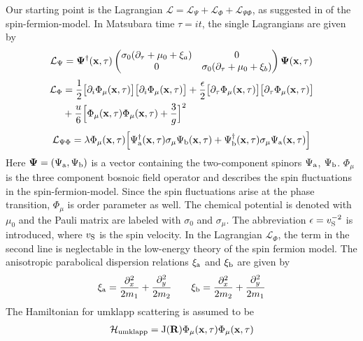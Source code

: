 Our starting point is the Lagrangian $\mathcal{L} = \mathcal{L}_{\Psi} + \mathcal{L}_{\Phi} + \mathcal{L}_{\Psi\Phi}$, as suggested in \cite{Patel&Sachdev} of the spin-fermion-model.
In Matsubara time $\tau = it$, the single Lagrangians are given by
%
\begin{align}
	\mathcal{L}_{\Psi} = 
		\vb{\Psi}^{\dag}(\vb{x},\tau)
		\begin{pmatrix}\sigma_{0} (\partial_{\tau}+\mu_{0}+\xi_{a}) & 0\\0 & \sigma_{0} (\partial_{\tau}+\mu_{0}+\xi_{b})\end{pmatrix}
		\vb{\Psi}(\vb{x},\tau)
\end{align}
%
\begin{align}
	\mathcal{L}_{\Phi} &= 
		\frac{1}{2} \big[\partial_{i}\Phi_{\mu}(\vb{x},\tau)\big] \big[\partial_{i}\Phi_{\mu}(\vb{x},\tau)\big] 
		+ 
		\frac{\epsilon}{2} \big[\partial_{\tau}\Phi_{\mu}(\vb{x},\tau)\big] \big[\partial_{\tau}\Phi_{\mu}(\vb{x},\tau)\big] 
		\notag \\&+
		\frac{u}{6} \Big[\Phi_{\mu}(\vb{x},\tau) \Phi_{\mu}(\vb{x},\tau) + \frac{3}{g}\Big]^{2}
\end{align}
%
\begin{align}
	\mathcal{L}_{\Psi\Phi} =
		\lambda\Phi_{\mu}(\vb{x},\tau) \Big[\Psi_{\mathrm{a}}^{\dag}(\vb{x},\tau) \sigma_{\mu} \Psi_{\mathrm{b}}(\vb{x},\tau) + \Psi_{\mathrm{b}}^{\dag}(\vb{x},\tau) \sigma_{\mu} \Psi_{\mathrm{a}}(\vb{x},\tau)\Big]
\end{align}
%
Here $\vb{\Psi} = (\Psi_{\mathrm{a}}, \Psi_{\mathrm{b}})$ is a vector containing the two-component spinors $\Psi_{\mathrm{a}}$, $\Psi_{\mathrm{b}}$.
$\Phi_{\mu}$ is the three component bosnoic field operator and describes the spin fluctuations in the spin-fermion-model.
Since the spin fluctuations arise at the phase transition, $\Phi_{\mu}$ is order parameter as well.
The chemical potential is denoted with $\mu_{0}$ and the Pauli matrix are labeled with $\sigma_{0}$ and $\sigma_{\mu}$.
The abbreviation $\epsilon = v_{\mathrm{S}}^{-2}$ is introduced, where $v_{\mathrm{S}}$ is the spin velocity.
In the Lagrangian $\mathcal{L}_{\Phi}$, the term in the second line is neglectable in the low-energy theory of the spin fermion model.
The anisotropic parabolical dispersion relations $\xi_{\mathrm{a}}$ and $\xi_{\mathrm{b}}$ are given by 
%
\begin{align}
	\xi_{\mathrm{a}} = \frac{\partial_{x}^{2}}{2m_{1}} + \frac{\partial_{y}^{2}}{2m_{2}} \qquad \xi_{\mathrm{b}} = \frac{\partial_{x}^{2}}{2m_{2}} + \frac{\partial_{y}^{2}}{2m_{1}}
\end{align}
%
The Hamiltonian for umklapp scattering is assumed to be 
%
\begin{align}
	\mathcal{H}_{\mathrm{umklapp}}= \mathrm{J}(\vb{R}) \Phi_{\mu}(\vb{x},\tau) \Phi_{\mu}(\vb{x},\tau)
\end{align}
